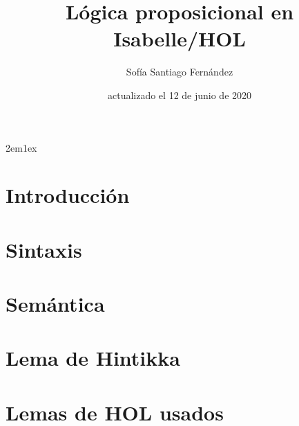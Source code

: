 \documentclass[12pt,a4paper,fleqn]{book}
\begin{document}
\title{Lógica proposicional en Isabelle/HOL}
\author{Sofía Santiago Fernández}
\date{actualizado el 12 de junio de 2020}
\maketitle

\tableofcontents

\parindent 2em\parskip 1ex

% 

\chapter{Introducción}


\chapter{Sintaxis}


\chapter{Semántica}


\chapter{Lema de Hintikka}


\appendix
\chapter{Lemas de HOL usados}


\nocite{fitting1996first,LMF,CC,articulo,escribir,tutorial,main,isar,implementation,datatypes}



\todototoc
\listoftodos
\end{document}
